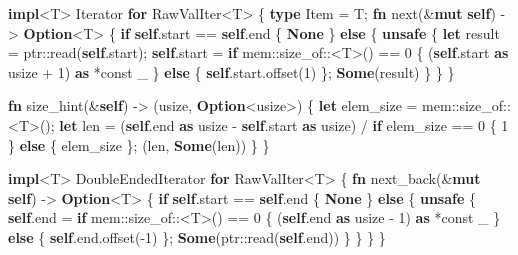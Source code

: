 \documentclass[a4paper,]{book}
\newenvironment{Shaded}{\begin{snugshade}}{\end{snugshade}}
\newcommand{\KeywordTok}[1]{\textcolor[rgb]{0.13,0.29,0.53}{\textbf{{#1}}}}
\newcommand{\DecValTok}[1]{\textcolor[rgb]{0.00,0.00,0.81}{{#1}}}
\newcommand{\NormalTok}[1]{{#1}}
\begin{document}
\begin{Shaded}
\begin{Highlighting}[]
\KeywordTok{impl}\NormalTok{<T> Iterator }\KeywordTok{for} \NormalTok{RawValIter<T> \{}
    \KeywordTok{type} \NormalTok{Item = T;}
    \KeywordTok{fn} \NormalTok{next(&}\KeywordTok{mut} \KeywordTok{self}\NormalTok{) -> }\KeywordTok{Option}\NormalTok{<T> \{}
        \KeywordTok{if} \KeywordTok{self}\NormalTok{.start == }\KeywordTok{self}\NormalTok{.end \{}
            \KeywordTok{None}
        \NormalTok{\} }\KeywordTok{else} \NormalTok{\{}
            \KeywordTok{unsafe} \NormalTok{\{}
                \KeywordTok{let} \NormalTok{result = ptr::read(}\KeywordTok{self}\NormalTok{.start);}
                \KeywordTok{self}\NormalTok{.start = }\KeywordTok{if} \NormalTok{mem::size_of::<T>() == }\DecValTok{0} \NormalTok{\{}
                    \NormalTok{(}\KeywordTok{self}\NormalTok{.start }\KeywordTok{as} \NormalTok{usize + }\DecValTok{1}\NormalTok{) }\KeywordTok{as} \NormalTok{*const _}
                \NormalTok{\} }\KeywordTok{else} \NormalTok{\{}
                    \KeywordTok{self}\NormalTok{.start.offset(}\DecValTok{1}\NormalTok{)}
                \NormalTok{\};}
                \KeywordTok{Some}\NormalTok{(result)}
            \NormalTok{\}}
        \NormalTok{\}}
    \NormalTok{\}}

    \KeywordTok{fn} \NormalTok{size_hint(&}\KeywordTok{self}\NormalTok{) -> (usize, }\KeywordTok{Option}\NormalTok{<usize>) \{}
        \KeywordTok{let} \NormalTok{elem_size = mem::size_of::<T>();}
        \KeywordTok{let} \NormalTok{len = (}\KeywordTok{self}\NormalTok{.end }\KeywordTok{as} \NormalTok{usize - }\KeywordTok{self}\NormalTok{.start }\KeywordTok{as} \NormalTok{usize)}
                  \NormalTok{/ }\KeywordTok{if} \NormalTok{elem_size == }\DecValTok{0} \NormalTok{\{ }\DecValTok{1} \NormalTok{\} }\KeywordTok{else} \NormalTok{\{ elem_size \};}
        \NormalTok{(len, }\KeywordTok{Some}\NormalTok{(len))}
    \NormalTok{\}}
\NormalTok{\}}

\KeywordTok{impl}\NormalTok{<T> DoubleEndedIterator }\KeywordTok{for} \NormalTok{RawValIter<T> \{}
    \KeywordTok{fn} \NormalTok{next_back(&}\KeywordTok{mut} \KeywordTok{self}\NormalTok{) -> }\KeywordTok{Option}\NormalTok{<T> \{}
        \KeywordTok{if} \KeywordTok{self}\NormalTok{.start == }\KeywordTok{self}\NormalTok{.end \{}
            \KeywordTok{None}
        \NormalTok{\} }\KeywordTok{else} \NormalTok{\{}
            \KeywordTok{unsafe} \NormalTok{\{}
                \KeywordTok{self}\NormalTok{.end = }\KeywordTok{if} \NormalTok{mem::size_of::<T>() == }\DecValTok{0} \NormalTok{\{}
                    \NormalTok{(}\KeywordTok{self}\NormalTok{.end }\KeywordTok{as} \NormalTok{usize - }\DecValTok{1}\NormalTok{) }\KeywordTok{as} \NormalTok{*const _}
                \NormalTok{\} }\KeywordTok{else} \NormalTok{\{}
                    \KeywordTok{self}\NormalTok{.end.offset(-}\DecValTok{1}\NormalTok{)}
                \NormalTok{\};}
                \KeywordTok{Some}\NormalTok{(ptr::read(}\KeywordTok{self}\NormalTok{.end))}
            \NormalTok{\}}
        \NormalTok{\}}
    \NormalTok{\}}
\NormalTok{\}}





\end{Highlighting}
\end{Shaded}
\end{document}
